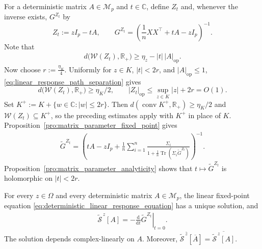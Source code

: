 \documentclass[EJP, preprint, NODS, nobera, nofontexpansion]{ejpecp}
\DeclareMathOperator{\op}{op}
\DeclareMathOperator{\tr}{Tr}
\begin{document}
For a deterministic matrix \(A\in\mathcal M_p\) and \(t\in\mathbb C\),
define \(Z_t\) and, whenever the inverse exists, \(G^{Z_t}\) by
\[
    Z_t:=zI_p-tA,
    \qquad
    G^{Z_t}
    =\left(\frac1nXX^\top+tA-zI_p\right)^{-1}.
\]
Note that
\begin{align}\label{eq:linear_response_path_separation}
    d\bigl(\mathcal W(Z_t),\mathbb R_+\bigr)
    \geq\eta_z-|t|\,|A|_{\op}.
\end{align}
Now choose $r:=\frac{\eta_K}{4}$. Uniformly for $z\in K$, $|t|<2r$, and $|A|_{\op}\leq1$,
\eqref{eq:linear_response_path_separation} gives
\[
    d\bigl(\mathcal W(Z_t),\mathbb R_+\bigr)\geq\eta_K/2,
    \qquad
    |Z_t|_{\op}\leq\sup_{z\in K}|z|+2r=O(1).
\]
Set $K^+:=K+\{w\in\mathbb C:|w|\leq2r\}$. Then
$d(\operatorname{conv}K^+,\mathbb R_+)\geq\eta_K/2$ and
$\mathcal W(Z_t)\subseteq K^+$, so the preceding estimates apply with
$K^+$ in place of $K$. Proposition~\ref{pro:matrix_parameter_fixed_point} gives
\begin{align}\label{eq:linear_response_deterministic_deformation}
 \widetilde G^{Z_t}
 =\left(
 tA-zI_p+\frac1n\sum_{i=1}^n
 \frac{\Sigma_i}
 {1+\frac1n\tr(\Sigma_i\widetilde G^{Z_t})}
 \right)^{-1}.
\end{align}
Proposition~\ref{pro:matrix_parameter_analyticity} shows that
$t\mapsto\widetilde G^{Z_t}$ is holomorphic on $|t|<2r$.

\begin{proposition}
\label{pro:deterministic_linear_response_equation}
For every $z\in\Omega$ and every deterministic matrix $A\in\mathcal M_p$,
the linear fixed-point equation
\eqref{eq:deterministic_linear_response_equation} has a unique solution, and
\begin{align}
    \widetilde{\mathcal S}^{\,z}[A]
    =
    -\left.
    \frac{\mathrm d}{\mathrm dt}
    \widetilde G^{Z_t}
    \right|_{t=0}.
\end{align}
The solution depends complex-linearly on $A$. Moreover, $\widetilde{\mathcal S}^{\,\bar z}[\overline A]
    =\overline{\widetilde{\mathcal S}^{\,z}[A]}$.
\end{proposition}
\end{document}
